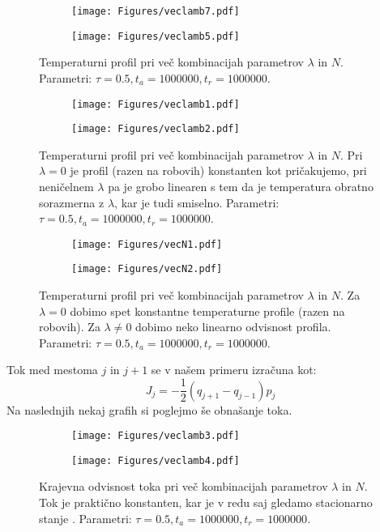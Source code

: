 \documentclass{article}
\begin{document}
\begin{figure}[H]
\centering
\begin{subfigure}{.49\textwidth}
\texttt{[image: Figures/veclamb7.pdf]}
\end{subfigure}
\begin{subfigure}{.49\textwidth}
\texttt{[image: Figures/veclamb5.pdf]}
\end{subfigure}
\caption*{Temperaturni profil pri več kombinacijah parametrov $\lambda$ in $N$. Parametri: $\tau=0.5, t_a=1000000, t_r=1000000$.}
\end{figure}
\begin{figure}[H]
\centering
\begin{subfigure}{.49\textwidth}
\texttt{[image: Figures/veclamb1.pdf]}
\end{subfigure}
\begin{subfigure}{.49\textwidth}
\texttt{[image: Figures/veclamb2.pdf]}
\end{subfigure}
\caption*{Temperaturni profil pri več kombinacijah parametrov $\lambda$ in $N$. Pri $\lambda=0$ je profil (razen na robovih) konstanten kot pričakujemo, pri neničelnem $\lambda$ pa je grobo linearen s tem da je temperatura obratno sorazmerna z $\lambda$, kar je tudi smiselno. Parametri: $\tau=0.5, t_a=1000000, t_r=1000000$.}
\end{figure}

\begin{figure}[H]
\centering
\begin{subfigure}{.49\textwidth}
\texttt{[image: Figures/vecN1.pdf]}
\end{subfigure}
\begin{subfigure}{.49\textwidth}
\texttt{[image: Figures/vecN2.pdf]}
\end{subfigure}
\caption*{Temperaturni profil pri več kombinacijah parametrov $\lambda$ in $N$. Za $\lambda=0$ dobimo spet konstantne temperaturne profile (razen na robovih). Za $\lambda \neq 0$ dobimo neko linearno odvisnost profila. Parametri: $\tau=0.5, t_a=1000000, t_r=1000000$.}
\end{figure}
Tok med mestoma $j$ in $j+1$ se v našem primeru izračuna kot:
\begin{equation*}
J_j = -\frac{1}{2} \left( q_{j+1} - q_{j-1} \right) p_j
\end{equation*}
Na naslednjih nekaj grafih si poglejmo še obnašanje toka.

\begin{figure}[H]
\centering
\begin{subfigure}{.49\textwidth}
\texttt{[image: Figures/veclamb3.pdf]}
\end{subfigure}
\begin{subfigure}{.49\textwidth}
\texttt{[image: Figures/veclamb4.pdf]}
\end{subfigure}
\caption*{Krajevna odvisnost toka pri več kombinacijah parametrov $\lambda$ in $N$. Tok je praktično konstanten, kar je v redu saj gledamo stacionarno stanje . Parametri: $\tau=0.5, t_a=1000000, t_r=1000000$.}
\end{figure}
\end{document}
